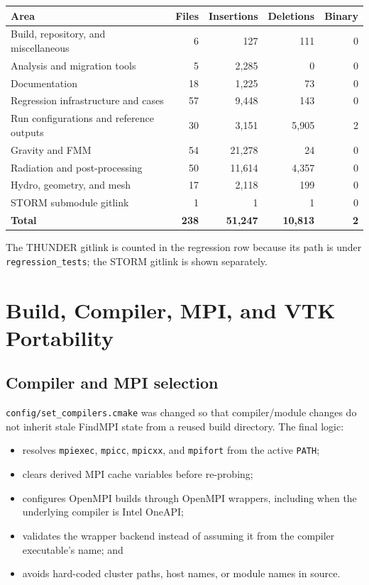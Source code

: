 \documentclass[10pt,a4paper]{article}
\newcommand{\file}[1]{\nolinkurl{#1}}
\begin{document}
\begin{longtable}{@{}>{\raggedright\arraybackslash}p{55mm}rrrr@{}}
\toprule
Area & Files & Insertions & Deletions & Binary \\
\midrule
\endhead
Build, repository, and miscellaneous & 6 & 127 & 111 & 0 \\
Analysis and migration tools & 5 & 2,285 & 0 & 0 \\
Documentation & 18 & 1,225 & 73 & 0 \\
Regression infrastructure and cases & 57 & 9,448 & 143 & 0 \\
Run configurations and reference outputs & 30 & 3,151 & 5,905 & 2 \\
Gravity and FMM & 54 & 21,278 & 24 & 0 \\
Radiation and post-processing & 50 & 11,614 & 4,357 & 0 \\
Hydro, geometry, and mesh & 17 & 2,118 & 199 & 0 \\
STORM submodule gitlink & 1 & 1 & 1 & 0 \\
\midrule
\textbf{Total} & \textbf{238} & \textbf{51,247} & \textbf{10,813} & \textbf{2} \\
\bottomrule
\end{longtable}

The THUNDER gitlink is counted in the regression row because its path is under
\file{regression_tests}; the STORM gitlink is shown separately.

\section{Build, Compiler, MPI, and VTK Portability}

\subsection{Compiler and MPI selection}

\file{config/set_compilers.cmake} was changed so that compiler/module changes
do not inherit stale FindMPI state from a reused build directory.  The final
logic:
\begin{itemize}
  \item resolves \file{mpiexec}, \file{mpicc}, \file{mpicxx}, and
        \file{mpifort} from the active \file{PATH};
  \item clears derived MPI cache variables before re-probing;
  \item configures OpenMPI builds through OpenMPI wrappers, including when the
        underlying compiler is Intel OneAPI;
  \item validates the wrapper backend instead of assuming it from the compiler
        executable's name; and
  \item avoids hard-coded cluster paths, host names, or module names in source.
\end{itemize}
\end{document}
